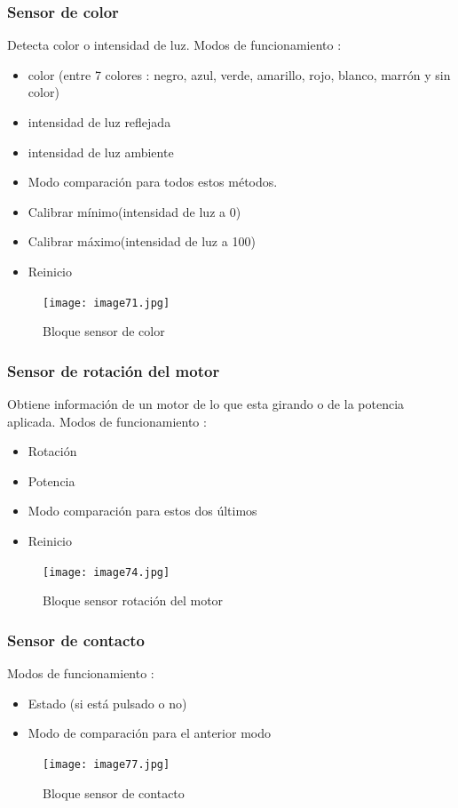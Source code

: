 \documentclass[12pt,a4paper]{article}
\begin{document}
\subsubsection{Sensor de color}
Detecta color o intensidad de luz.
Modos de funcionamiento :
\begin{itemize}
\item color (entre 7 colores : negro, azul, verde, amarillo, rojo, blanco, marrón y sin color)
\item intensidad de luz reflejada
\item intensidad de luz ambiente
\item Modo comparación para todos estos métodos.
\item Calibrar mínimo(intensidad de luz a 0)
\item Calibrar máximo(intensidad de luz a 100)
\item Reinicio
\end{itemize}
\begin{figure}[H]
	\caption{Bloque sensor de color}
	\texttt{[image: image71.jpg]}
	\centering
\end{figure}
\subsubsection{Sensor de rotación del motor}
Obtiene información de un motor de lo que esta girando o de la potencia aplicada.
Modos de funcionamiento :
\begin{itemize}
\item Rotación
\item Potencia
\item Modo comparación para estos dos últimos
\item Reinicio
\end{itemize}
\begin{figure}[H]
	\caption{Bloque sensor rotación del motor}
	\texttt{[image: image74.jpg]}
	\centering
\end{figure}
\subsubsection{Sensor de contacto}
Modos de funcionamiento :
\begin{itemize}
\item Estado (si está pulsado o no)
\item Modo de comparación para el anterior modo
\end{itemize}
\begin{figure}[H]
	\caption{Bloque sensor de contacto}
	\texttt{[image: image77.jpg]}
	\centering
\end{figure}
\end{document}
